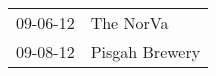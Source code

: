 \begin{supertabular}{p{0.25\columnwidth}p{0.75\columnwidth}}
 09-06-12 &       The NorVa \\
 09-08-12 &  Pisgah Brewery \\
\end{supertabular}
